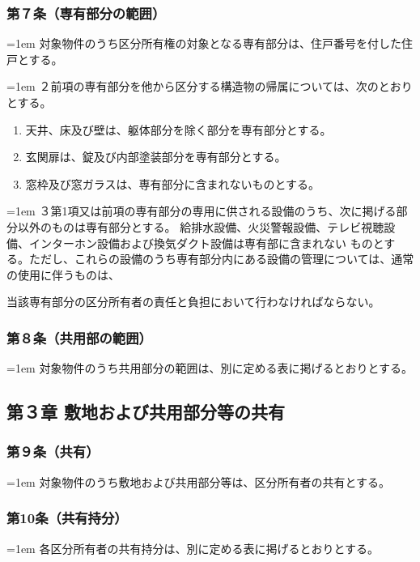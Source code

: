 \documentclass[
  twoside,
  luatex,
  paper=a4paper,
  fontsize=11pt,
  jafontsize=11pt,
  jlreq_notes,
]{jlreq}
\newcommand{\joumain}[1]{%
  \noindent\hangindent=1em\hangafter=1
  \hspace{1em}#1%
}
\newcommand{\kou}[2]{%
  \par\noindent\hangindent=1em\hangafter=1
  #1\hspace{1em}#2%
}
\begin{document}
  \subsubsection*{ 第７条（専有部分の範囲）}
  \joumain{対象物件のうち区分所有権の対象となる専有部分は、住戸番号を付した住戸とする。}
  \kou{２}{前項の専有部分を他から区分する構造物の帰属については、次のとおりとする。}
  \begin{enumerate}
    \item 天井、床及び壁は、躯体部分を除く部分を専有部分とする。
    \item 玄関扉は、錠及び内部塗装部分を専有部分とする。
    \item 窓枠及び窓ガラスは、専有部分に含まれないものとする。 
  \end{enumerate}
  \kou{３}{第1項又は前項の専有部分の専用に供される設備のうち、次に掲げる部分以外のものは専有部分とする。
  給排水設備、火災警報設備、テレビ視聴設備、インターホン設備および換気ダクト設備は専有部に含まれない
  ものとする。ただし、これらの設備のうち専有部分内にある設備の管理については、通常の使用に伴うものは、}
  当該専有部分の区分所有者の責任と負担において行わなければならない。

  \subsubsection*{第８条（共用部の範囲）}
  \joumain{対象物件のうち共用部分の範囲は、別に定める表に掲げるとおりとする。}
  
  \begin{center}
    \subsection*{第３章 敷地および共用部分等の共有}
  \end{center}

  \subsubsection*{第９条（共有）}
  \joumain{対象物件のうち敷地および共用部分等は、区分所有者の共有とする。}

  \subsubsection*{第10条（共有持分）}
  \joumain{各区分所有者の共有持分は、別に定める表に掲げるとおりとする。}
\end{document}

